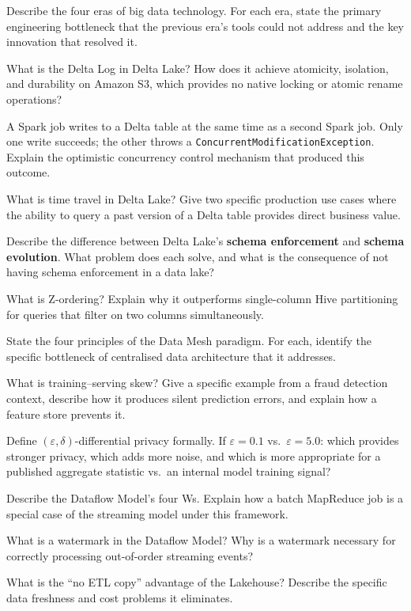 
\sq Describe the four eras of big data technology. For each era, state
the primary engineering bottleneck that the previous era's tools could
not address and the key innovation that resolved it.

\sq What is the Delta Log in Delta Lake? How does it achieve atomicity,
isolation, and durability on Amazon S3, which provides no native locking
or atomic rename operations?

\sq A Spark job writes to a Delta table at the same time as a second Spark
job. Only one write succeeds; the other throws a \texttt{ConcurrentModificationException}.
Explain the optimistic concurrency control mechanism that produced this outcome.

\sq What is time travel in Delta Lake? Give two specific production use
cases where the ability to query a past version of a Delta table provides
direct business value.

\sq Describe the difference between Delta Lake's \textbf{schema enforcement}
and \textbf{schema evolution}. What problem does each solve, and what
is the consequence of not having schema enforcement in a data lake?

\sq What is Z-ordering? Explain why it outperforms single-column Hive
partitioning for queries that filter on two columns simultaneously.

\sq State the four principles of the Data Mesh paradigm. For each, identify
the specific bottleneck of centralised data architecture that it addresses.

\sq What is training--serving skew? Give a specific example from a fraud
detection context, describe how it produces silent prediction errors,
and explain how a feature store prevents it.

\sq Define $(\varepsilon, \delta)$-differential privacy formally. If
$\varepsilon = 0.1$ vs.\ $\varepsilon = 5.0$: which provides stronger
privacy, which adds more noise, and which is more appropriate for a
published aggregate statistic vs.\ an internal model training signal?

\sq Describe the Dataflow Model's four Ws. Explain how a batch MapReduce
job is a special case of the streaming model under this framework.

\sq What is a watermark in the Dataflow Model? Why is a watermark necessary
for correctly processing out-of-order streaming events?

\sq What is the ``no ETL copy'' advantage of the Lakehouse? Describe
the specific data freshness and cost problems it eliminates.

